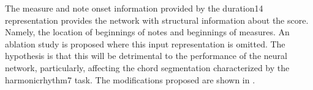 
The measure and note onset information provided by the
\gls{duration14} representation provides the network with
structural information about the score. Namely, the location
of beginnings of notes and beginnings of measures. An
ablation study is proposed where this input representation
is omitted. The hypothesis is that this will be detrimental
to the performance of the neural network, particularly,
affecting the chord segmentation characterized by the
\gls{harmonicrhythm7} task. The modifications proposed are
shown in .

